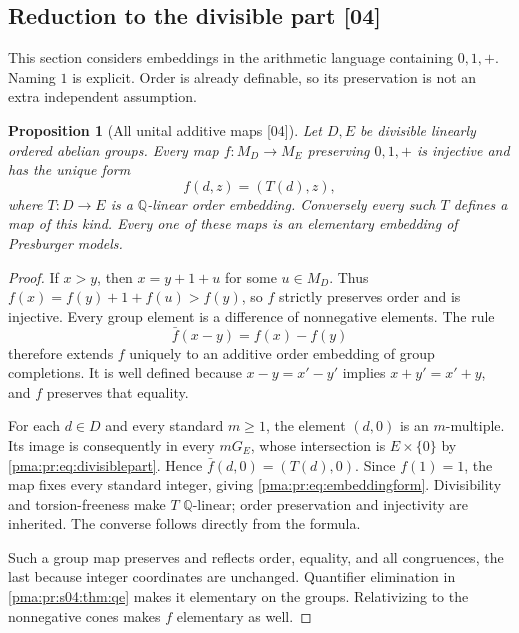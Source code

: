 \documentclass[11pt]{article}
\numberwithin{equation}{section}
\newtheorem{proposition}[proposition]{Proposition}
\theoremstyle{definition}
\theoremstyle{remark}
\newcommand{\Q}{\mathbb Q}
\newcommand{\src}[1]{\textup{\textsf{\small[#1]}}}
\begin{document}
\subsection{Reduction to the divisible part \src{04}}\label{pma:pr:sec:reduction}

This section considers embeddings in the arithmetic language containing
$0,1,+$. Naming $1$ is explicit. Order is already definable, so its
preservation is not an extra independent assumption.

\begin{proposition}[All unital additive maps \src{04}]\label{pma:pr:prop:embeddingreduction}
Let $D,E$ be divisible linearly ordered abelian groups. Every map
$f:M_D\to M_E$ preserving $0,1,+$ is injective and has the unique form
\begin{equation}\label{pma:pr:eq:embeddingform}
 f(d,z)=(T(d),z),
\end{equation}
where $T:D\to E$ is a $\Q$-linear order embedding. Conversely every such
$T$ defines a map of this kind. Every one of these maps is an elementary
embedding of Presburger models.
\end{proposition}

\begin{proof}
If $x>y$, then $x=y+1+u$ for some $u\in M_D$. Thus
$f(x)=f(y)+1+f(u)>f(y)$, so $f$ strictly preserves order and is injective.
Every group element is a difference of nonnegative elements. The rule
\[
 \bar f(x-y)=f(x)-f(y)
\]
therefore extends $f$ uniquely to an additive order embedding of group
completions. It is well defined because $x-y=x'-y'$ implies
$x+y'=x'+y$, and $f$ preserves that equality.

For each $d\in D$ and every standard $m\geq1$, the element $(d,0)$ is an
$m$-multiple. Its image is consequently in every $mG_E$, whose intersection
is $E\times\{0\}$ by \eqref{pma:pr:eq:divisiblepart}. Hence
$\bar f(d,0)=(T(d),0)$. Since $f(1)=1$, the map fixes every standard
integer, giving \eqref{pma:pr:eq:embeddingform}. Divisibility and torsion-freeness
make $T$ $\Q$-linear; order preservation and injectivity are inherited.
The converse follows directly from the formula.

Such a group map preserves and reflects order, equality, and all
congruences, the last because integer coordinates are unchanged.
Quantifier elimination in \cref{pma:pr:s04:thm:qe} makes it elementary on the groups.
Relativizing to the nonnegative cones makes $f$ elementary as well.
\end{proof}
\end{document}
